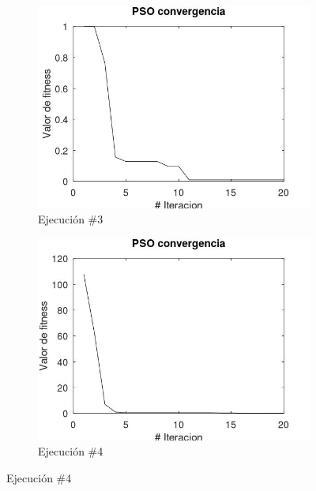 \documentclass[12pt, a4paper]{article}
\begin{document}
        \begin{figure}[H]
             \centering
             \begin{subfigure}[b]{0.3\textwidth}
                 \centering
                 \includegraphics[width=\textwidth]{img/pso3.jpg}
                 \caption{Ejecución \#3}
                 \label{fig:pso3}
             \end{subfigure}
             \hfill
             \begin{subfigure}[b]{0.3\textwidth}
                 \centering
                 \includegraphics[width=\textwidth]{img/pso4.jpg}
                 \caption{Ejecución \#4}
                 \label{fig:pso4}
             \end{subfigure}

\end{figure}
\end{document}
